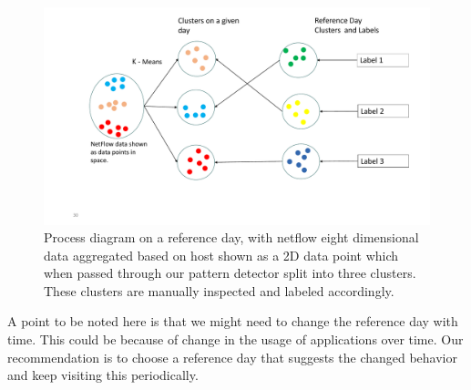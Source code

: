  \begin{figure}[t]
 	\centerline{\includegraphics[scale = 0.5]{assign_prob.pdf}}
 	\caption{Process diagram on a reference day, with netflow eight dimensional data aggregated based on host shown as a 2D data point which when passed through our pattern detector split into three clusters. These clusters are manually inspected and labeled accordingly. }%
 \end{figure}

A point to be noted here is that we might need to change the reference day with time. This could be because of change in the usage of applications over time. Our recommendation is to choose a reference day that suggests the changed behavior and keep visiting this periodically.
